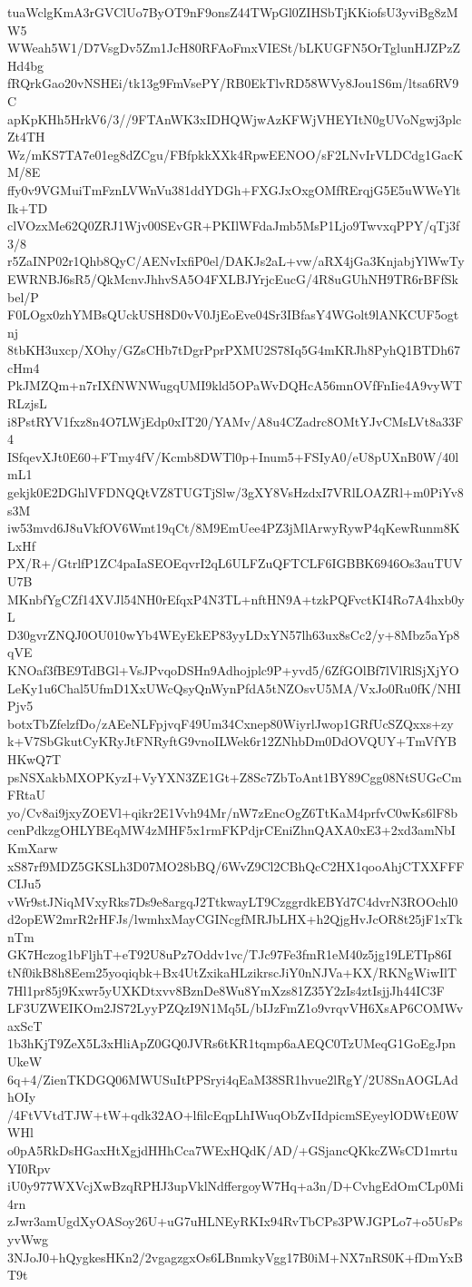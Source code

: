 tuaWclgKmA3rGVClUo7ByOT9nF9onsZ44TWpGl0ZIHSbTjKKiofsU3yviBg8zMW5
WWeah5W1/D7VsgDv5Zm1JcH80RFAoFmxVIESt/bLKUGFN5OrTglunHJZPzZHd4bg
fRQrkGao20vNSHEi/tk13g9FmVsePY/RB0EkTlvRD58WVy8Jou1S6m/ltsa6RV9C
apKpKHh5HrkV6/3//9FTAnWK3xIDHQWjwAzKFWjVHEYItN0gUVoNgwj3plcZt4TH
Wz/mKS7TA7e01eg8dZCgu/FBfpkkXXk4RpwEENOO/sF2LNvIrVLDCdg1GacKM/8E
ffy0v9VGMuiTmFznLVWnVu381ddYDGh+FXGJxOxgOMfRErqjG5E5uWWeYltIk+TD
clVOzxMe62Q0ZRJ1Wjv00SEvGR+PKIlWFdaJmb5MsP1Ljo9TwvxqPPY/qTj3f3/8
r5ZaINP02r1Qhb8QyC/AENvIxfiP0el/DAKJs2aL+vw/aRX4jGa3KnjabjYlWwTy
EWRNBJ6sR5/QkMcnvJhhvSA5O4FXLBJYrjcEucG/4R8uGUhNH9TR6rBFfSkbel/P
F0LOgx0zhYMBsQUckUSH8D0vV0JjEoEve04Sr3IBfasY4WGolt9lANKCUF5ogtnj
8tbKH3uxcp/XOhy/GZsCHb7tDgrPprPXMU2S78Iq5G4mKRJh8PyhQ1BTDh67cHm4
PkJMZQm+n7rIXfNWNWugqUMI9kld5OPaWvDQHcA56mnOVfFnIie4A9vyWTRLzjsL
i8PstRYV1fxz8n4O7LWjEdp0xIT20/YAMv/A8u4CZadrc8OMtYJvCMsLVt8a33F4
ISfqevXJt0E60+FTmy4fV/Kcmb8DWTl0p+Inum5+FSIyA0/eU8pUXnB0W/40lmL1
gekjk0E2DGhlVFDNQQtVZ8TUGTjSlw/3gXY8VsHzdxI7VRlLOAZRl+m0PiYv8s3M
iw53mvd6J8uVkfOV6Wmt19qCt/8M9EmUee4PZ3jMlArwyRywP4qKewRunm8KLxHf
PX/R+/GtrlfP1ZC4paIaSEOEqvrI2qL6ULFZuQFTCLF6IGBBK6946Os3auTUVU7B
MKnbfYgCZf14XVJl54NH0rEfqxP4N3TL+nftHN9A+tzkPQFvctKI4Ro7A4hxb0yL
D30gvrZNQJ0OU010wYb4WEyEkEP83yyLDxYN57lh63ux8sCc2/y+8Mbz5aYp8qVE
KNOaf3fBE9TdBGl+VsJPvqoDSHn9Adhojplc9P+yvd5/6ZfGOlBf7lVlRlSjXjYO
LeKy1u6Chal5UfmD1XxUWcQsyQnWynPfdA5tNZOsvU5MA/VxJo0Ru0fK/NHIPjv5
botxTbZfelzfDo/zAEeNLFpjvqF49Um34Cxnep80WiyrlJwop1GRfUcSZQxxs+zy
k+V7SbGkutCyKRyJtFNRyftG9vnoILWek6r12ZNhbDm0DdOVQUY+TmVfYBHKwQ7T
psNSXakbMXOPKyzI+VyYXN3ZE1Gt+Z8Sc7ZbToAnt1BY89Cgg08NtSUGcCmFRtaU
yo/Cv8ai9jxyZOEVl+qikr2E1Vvh94Mr/nW7zEncOgZ6TtKaM4prfvC0wKs6lF8b
cenPdkzgOHLYBEqMW4zMHF5x1rmFKPdjrCEniZhnQAXA0xE3+2xd3amNbIKmXarw
xS87rf9MDZ5GKSLh3D07MO28bBQ/6WvZ9Cl2CBhQcC2HX1qooAhjCTXXFFFCIJu5
vWr9stJNiqMVxyRks7Ds9e8argqJ2TtkwayLT9CzggrdkEBYd7C4dvrN3ROOchl0
d2opEW2mrR2rHFJs/lwmhxMayCGINcgfMRJbLHX+h2QjgHvJcOR8t25jF1xTknTm
GK7Hczog1bFljhT+eT92U8uPz7Oddv1vc/TJc97Fe3fmR1eM40z5jg19LETIp86I
tNf0ikB8h8Eem25yoqiqbk+Bx4UtZxikaHLzikrscJiY0nNJVa+KX/RKNgWiwIlT
7Hl1pr85j9Kxwr5yUXKDtxvv8BznDe8Wu8YmXzs81Z35Y2zIs4ztIsjjJh44IC3F
LF3UZWEIKOm2JS72LyyPZQzI9N1Mq5L/bIJzFmZ1o9vrqvVH6XsAP6COMWvaxScT
1b3hKjT9ZeX5L3xHliApZ0GQ0JVRs6tKR1tqmp6aAEQC0TzUMeqG1GoEgJpnUkeW
6q+4/ZienTKDGQ06MWUSuItPPSryi4qEaM38SR1hvue2lRgY/2U8SnAOGLAdhOIy
/4FtVVtdTJW+tW+qdk32AO+lfilcEqpLhIWuqObZvIIdpicmSEyeylODWtE0WWHl
o0pA5RkDsHGaxHtXgjdHHhCca7WExHQdK/AD/+GSjancQKkcZWsCD1mrtuYI0Rpv
iU0y977WXVcjXwBzqRPHJ3upVklNdffergoyW7Hq+a3n/D+CvhgEdOmCLp0Mi4rn
zJwr3amUgdXyOASoy26U+uG7uHLNEyRKIx94RvTbCPs3PWJGPLo7+o5UsPsyvWwg
3NJoJ0+hQygkesHKn2/2vgagzgxOs6LBnmkyVgg17B0iM+NX7nRS0K+fDmYxBT9t
